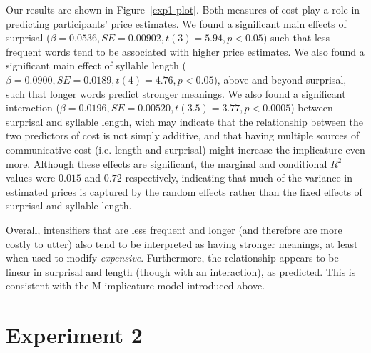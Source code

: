 \documentclass[10pt,letterpaper]{article}
\begin{document}
Our results are shown in Figure~\ref{exp1-plot}. Both measures of cost play a role in predicting participants' price estimates. We found a significant main effects of surprisal ($\beta=0.0536, SE=0.00902, t(3)=5.94, p<0.05$) such that less frequent words tend to be associated with higher price estimates. We also found a significant main effect of syllable length ($\beta=0.0900, SE=0.0189, t(4)=4.76, p<0.05$), above and beyond surprisal, such that longer words predict stronger meanings. We also found a significant interaction ($\beta=0.0196, SE=0.00520, t(3.5)=3.77, p<0.0005$) between surprisal and syllable length, wich may indicate that the relationship between the two predictors of cost is not simply additive, and that having multiple sources of communicative cost (i.e. length and surprisal) might increase the implicature even more. Although these effects are significant, the marginal and conditional $R^2$ values \cite{barton2014} were $0.015$ and $0.72$ respectively, indicating that much of the variance in estimated prices is captured by the random effects rather than the fixed effects of surprisal and syllable length.

Overall, intensifiers that are less frequent and longer (and therefore are more costly to utter) also tend to be interpreted as having stronger meanings, at least when used to modify \emph{expensive}. Furthermore, the relationship appears to be linear in surprisal and length (though with an interaction), as predicted.
This is consistent with the M-implicature model introduced above.

\section{Experiment 2}
\end{document}

